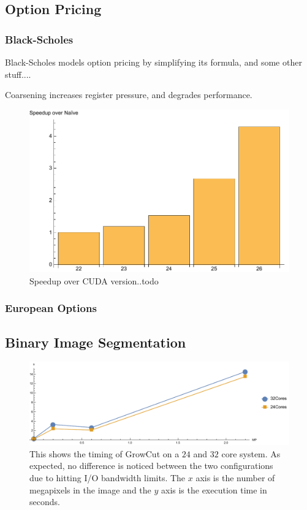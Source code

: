 \subsection{Option Pricing}

\subsubsection{Black-Scholes}
Black-Scholes models option pricing by simplifying its formula, and some other stuff....


Coarsening increases register pressure, and degrades performance.


\begin{figure}
\centering
\includegraphics[scale=0.5]{data/blackscholes.pdf}
\caption{Speedup over CUDA version..todo}
\label{fig:blackscholes}
\centering
\end{figure}


\subsubsection{European Options}

\subsection{Binary Image Segmentation}

\begin{figure}
\centering
\includegraphics[scale=0.4]{fig/growcut.pdf}
\caption{This shows the timing of GrowCut on a $24$ and $32$ core system.
As expected, no difference is noticed between the two configurations due to hitting I/O
bandwidth limits. The $x$ axis is the number of megapixels in the image and the $y$ axis is the execution time in seconds.}
\label{fig:growcut}
\centering
\end{figure}

